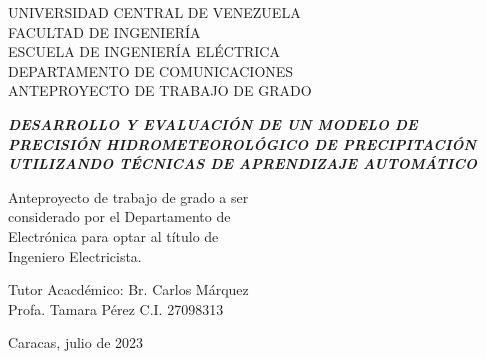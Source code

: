 \begin{titlepage}
  \centering
  { UNIVERSIDAD CENTRAL DE VENEZUELA \\
  FACULTAD DE INGENIERÍA\\
ESCUELA DE INGENIERÍA ELÉCTRICA\\
DEPARTAMENTO DE COMUNICACIONES\\
ANTEPROYECTO DE TRABAJO DE GRADO \\}
  
  \null\vfill
    \centering
    {\large
    \textbf{\textit{DESARROLLO Y EVALUACIÓN DE UN MODELO DE PRECISIÓN HIDROMETEOROLÓGICO DE PRECIPITACIÓN UTILIZANDO TÉCNICAS DE APRENDIZAJE AUTOMÁTICO\\}}}
    \null
    \vfill
    {
      \begin{flushright}
      \small Anteproyecto de trabajo de grado a ser \\
      considerado por el Departamento de \\
      Electrónica para optar al título de \\
      Ingeniero Electricista.\\
    \end{flushright}
    }
    \vfill
    {
      Tutor Acacdémico: \hfill Br. Carlos Márquez \\
      Profa. Tamara Pérez \hfill C.I. 27098313
    }

    \null
    {Caracas, julio de 2023}
    \null\vfill
  \end{titlepage}